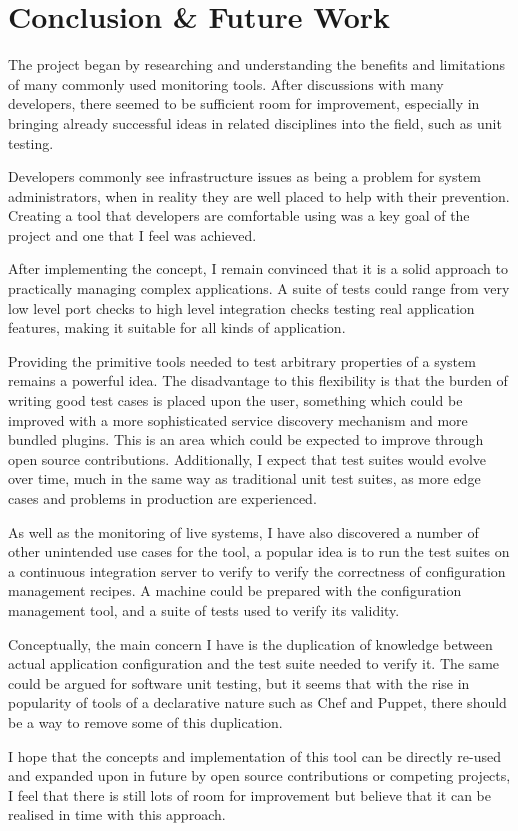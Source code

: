 \documentclass{cshonours}
\begin{document}
\chapter{Conclusion \& Future Work}

The project began by researching and understanding the benefits and limitations of many commonly used monitoring tools. After discussions with many developers, there seemed to be sufficient room for improvement, especially in bringing already successful ideas in related disciplines into the field, such as unit testing.

Developers commonly see infrastructure issues as being a problem for system administrators, when in reality they are well placed to help with their prevention. Creating a tool that developers are comfortable using was a key goal of the project and one that I feel was achieved.

After implementing the concept, I remain convinced that it is a solid approach to practically managing complex applications. A suite of tests could range from very low level port checks to high level integration checks testing real application features, making it suitable for all kinds of application.

Providing the primitive tools needed to test arbitrary properties of a system remains a powerful idea. The disadvantage to this flexibility is that the burden of writing good test cases is placed upon the user, something which could be improved with a more sophisticated service discovery mechanism and more bundled plugins. This is an area which could be expected to improve through open source contributions. Additionally, I expect that test suites would evolve over time, much in the same way as traditional unit test suites, as more edge cases and problems in production are experienced.

As well as the monitoring of live systems, I have also discovered a number of other unintended use cases for the tool, a popular idea is to run the test suites on a continuous integration server to verify to verify the correctness of configuration management recipes. A machine could be prepared with the configuration management tool, and a suite of tests used to verify its validity.

Conceptually, the main concern I have is the duplication of knowledge between actual application configuration and the test suite needed to verify it. The same could be argued for software unit testing, but it seems that with the rise in popularity of tools of a declarative nature such as Chef and Puppet, there should be a way to remove some of this duplication.

I hope that the concepts and implementation of this tool can be directly re-used and expanded upon in future by open source contributions or competing projects, I feel that there is still lots of room for improvement but believe that it can be realised in time with this approach.


\printbibliography[title=References]
% 
\end{document}
